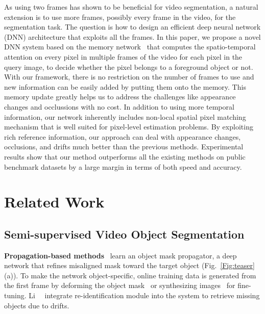 \documentclass[10pt,twocolumn,letterpaper]{article}
\newcommand{\fref}[1]{Fig.~\ref{#1}}
\renewcommand{\paragraph}[1]{\vspace{1mm}\noindent\textbf{#1}}
\begin{document}
As using two frames has shown to be beneficial for video segmentation, a natural extension is to use more frames, possibly every frame in the video, for the segmentation task. 
The question is how to design an efficient deep neural network (DNN) architecture that exploits all the frames. 
In this paper, we propose a novel DNN system based on the memory network~\cite{sukhbaatar2015end,miller2016key,kumar2016ask} that computes the spatio-temporal attention on every pixel in multiple frames of the video for each pixel in the query image, to decide whether the pixel belongs to a foreground object or not.
With our framework, there is no restriction on the number of frames to use and new information can be easily added by putting them onto the memory.
This memory update greatly helps us to address the challenges like appearance changes and occlussions with no cost.
In addition to using more temporal information, our network inherently includes non-local spatial pixel matching mechanism that is well suited for pixel-level estimation problems. 
By exploiting rich reference information, our approach can deal with appearance changes, occlusions, and drifts much better than the previous methods.
Experimental results show that our method outperforms all the existing methods on public benchmark datasets by a large margin in terms of both speed and accuracy.
















\section{Related Work}
\subsection{Semi-supervised Video Object Segmentation}
\paragraph{Propagation-based methods}~\cite{perazzi2017learning, khoreva2017lucid, hu2017maskrnn, li2018video} learn an object mask propagator, a deep network that refines misaligned mask toward the target object (\fref{Fig:teaser}(a)). 
To make the network object-specific, online training data is generated from the first frame by deforming the object mask~\cite{perazzi2017learning} or synthesizing images~\cite{khoreva2017lucid} for fine-tuning.
Li~\etal~\cite{li2018video} integrate re-identification module into the system to retrieve missing objects due to drifts.
\end{document}
